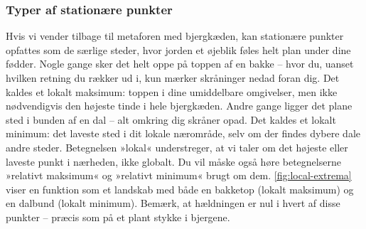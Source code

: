 \subsubsection*{Typer af stationære punkter}
Hvis vi vender tilbage til metaforen med bjergkæden, kan stationære punkter opfattes som de særlige steder, hvor jorden et øjeblik føles helt plan under dine fødder. Nogle gange sker det helt oppe på toppen af en bakke -- hvor du, uanset hvilken retning du rækker ud i, kun mærker skråninger nedad foran dig. Det kaldes et lokalt maksimum: toppen i dine umiddelbare omgivelser, men ikke nødvendigvis den højeste tinde i hele bjergkæden. Andre gange ligger det plane sted i bunden af en dal -- alt omkring dig skråner opad. Det kaldes et lokalt minimum: det laveste sted i dit lokale nærområde, selv om der findes dybere dale andre steder. Betegnelsen »lokal« understreger, at vi taler om det højeste eller laveste punkt i nærheden, ikke globalt. Du vil måske også høre betegnelserne »relativt maksimum« og »relativt minimum« brugt om dem. \autoref{fig:local-extrema} viser en funktion som et landskab med både en bakketop (lokalt maksimum) og en dalbund (lokalt minimum). Bemærk, at hældningen er nul i hvert af disse punkter -- præcis som på et plant stykke i bjergene.



